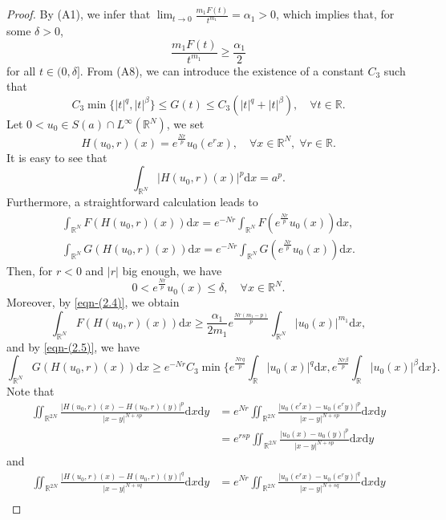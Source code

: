 \documentclass[reqno]{amsart}
\begin{document}
\begin{proof}
By {\rm (A1)}, we infer that $\lim_{t\to 0}\frac{m_1F(t)}{t^{m_1}}=\alpha_1>0$,
which implies that, for some $\delta>0$,
\begin{equation}
\label{eqn-(2.4)}
\frac{m_1F(t)}{t^{m_1}}\ge\frac{\alpha_1}{2}
\end{equation}
for all $t\in(0,\delta]$.
From (A8), we can introduce the existence of a constant $C_3$ such that
\begin{equation}\label{eqn-(2.5)}
C_{3}\min\{|t|^{q},|t|^{\beta}\}\le G(t)\le C_{3}(|t|^{q}+|t|^{\beta}),\quad 
\forall t\in\mathbb{R}.
\end{equation}
Let $0<u_0\in S(a)\cap L^{\infty}(\mathbb{R}^N)$, we set
$$
H(u_0,r)(x)=e^{\frac{Nr}{p}}u_0(e^{r}x),\quad\forall x \in \mathbb{R}^N,\;
\forall r\in\mathbb{R}.
$$
It is easy to see that
$$
\int_{\mathbb{R}^{N}}|H(u_0,r)(x)|^{p}\mathrm{d}x=a^{p}.
$$
Furthermore, a straightforward calculation leads to
\begin{gather*}
\int_{\mathbb{R}^{N}} F(H(u_0,r)(x))\mathrm{d}x
=e^{-Nr}\int_{\mathbb{R}^{N}}F(e^{\frac{Nr}{p}}u_0(x))\mathrm{d}x, \\
\int_{\mathbb{R}^{N}} G(H(u_0,r)(x))\mathrm{d}x
=e^{-Nr}\int_{\mathbb{R}^{N}}G(e^{\frac{Nr}{p}}u_0(x))\mathrm{d}x.
\end{gather*}
Then, for $r<0$ and $|r|$ big enough, we have
$$0< e^{\frac{Nr}{p}}u_0(x)\le\delta,\quad\forall x\in\mathbb{R}^N.$$
Moreover, by \eqref{eqn-(2.4)}, we obtain
$$\int_{\mathbb{R}^{N}}F(H(u_0,r)(x))\mathrm{d}x\ge\frac{\alpha_1}{2m_1}e^{\frac{Nr(m_1-p)}{p}}\int_{\mathbb{R}^N}|u_0(x)|^{m_1}\mathrm{d}x,$$
and by \eqref{eqn-(2.5)}, we have
$$
\int_{\mathbb{R}^{N}}G(H(u_0,r)(x))\mathrm{d}x
\ge e^{-Nr}C_{3}\min\{e^{\frac{Nrq}{p}}
\int_{\mathbb{R}}|u_0(x)|^{q}\mathrm{d}x,e^{\frac{Nr\beta}{p}}
\int_{\mathbb{R}}|u_0(x)|^{\beta}\mathrm{d}x\}.
$$
Note that
\begin{align*}
\iint_{\mathbb{R}^{2N}}\frac{|H(u_0,r)(x)-H(u_0,r)(y)|^p}{|x-y|^{N+sp}}
 \mathrm{d}x\mathrm{d}y
&=e^{Nr}\iint_{\mathbb{R}^{2N}}\frac{|u_0(e^{r}x)-u_0(e^{r}y)|^{p}}{|x-y|^{N+sp}}
 \mathrm{d}x\mathrm{d}y\\
&=e^{rsp}\iint_{\mathbb{R}^{2N}}\frac{|u_0(x)-u_0(y)|^{p}}{|x-y|^{N+sp}}
 \mathrm{d}x\mathrm{d}y
\end{align*}
and
\begin{align*}
\iint_{\mathbb{R}^{2N}}\frac{|H(u_0,r)(x)-H(u_0,r)(y)|^q}{|x-y|^{N+sq}}
 \mathrm{d}x\mathrm{d}y
&=e^{Nr}\iint_{\mathbb{R}^{2N}}\frac{|u_0(e^{r}x)-u_0(e^{r}y)|^{q}}{|x-y|^{N+sq}}
 \mathrm{d}x\mathrm{d}y\\

\end{align*}
\end{proof}
\end{document}
